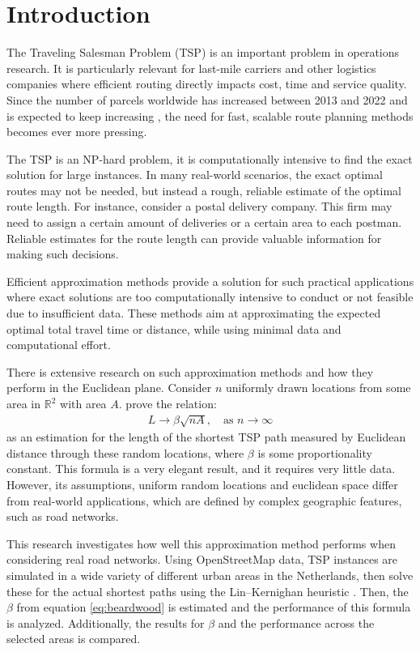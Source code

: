 \section{Introduction}
The Traveling Salesman Problem (TSP) is an important problem in operations research.
It is particularly relevant for last-mile carriers and other logistics companies where efficient
routing directly impacts cost, time and service quality. Since the number of parcels worldwide has
increased between 2013 and 2022 and is expected to keep increasing \citep{statista}, the need for
fast, scalable route planning methods becomes ever more pressing.

The TSP is an NP-hard problem, it is computationally intensive to find the exact solution for
large instances. In many real-world scenarios, the exact optimal routes may not be needed, but
instead a rough, reliable estimate of the optimal route length. For instance, consider a postal delivery company.
This firm may need to assign a certain amount of deliveries or a certain area to each postman.
Reliable estimates for the route length can provide valuable information for making such decisions.

Efficient approximation methods provide a solution for such practical applications where exact
solutions are too computationally intensive to conduct or not feasible due to insufficient data.
These methods aim at approximating the expected optimal total travel time or distance, while using
minimal data and computational effort.

There is extensive research on such approximation methods and how they perform in the Euclidean
plane.
Consider $n$ uniformly drawn locations from some area in $\mathbb{R}^2$ with area $A$.
\citet{beardwood1959shortest} prove the relation:
\begin{align}
	L \to \beta \sqrt{nA}, \quad \text{as } n \to \infty
	\label{eq:beardwood}
\end{align}
as an estimation for the length of the shortest TSP path measured by Euclidean distance through
these random locations, where $\beta$ is some proportionality constant. This formula is a very
elegant result, and it requires very little data. However, its assumptions,
uniform random locations and euclidean space differ from real-world applications, which are defined
by complex geographic features, such as road networks.

This research investigates how well this approximation method performs when considering real road
networks. Using OpenStreetMap \citep{openstreetmap} data, TSP instances are simulated in a wide variety of different urban areas
in the Netherlands, then solve these for the actual shortest paths using the Lin–Kernighan heuristic
\citep{lin1973effective}.
Then, the $\beta$ from equation \ref{eq:beardwood} is estimated and the performance of this
formula is analyzed. Additionally, the results for $\beta$ and the performance across the selected
areas is compared. 

